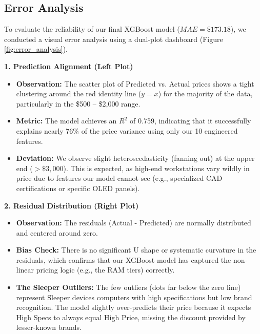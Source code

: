 \documentclass[11pt, a4paper]{article}
\begin{document}
\subsection{Error Analysis}
To evaluate the reliability of our final XGBoost\cite{xgboost2025} model ($MAE = \$173.18$), we conducted a visual error analysis using a dual-plot dashboard (Figure \ref{fig:error_analysis}).

\vspace{0.3cm}
\textbf{1. Prediction Alignment (Left Plot)}
\begin{itemize}
    \item \textbf{Observation:} The scatter plot of Predicted vs. Actual prices shows a tight clustering around the red identity line ($y=x$) for the majority of the data, particularly in the \$500 -- \$2,000 range.
    \item \textbf{Metric:} The model achieves an $R^2$ of 0.759, indicating that it successfully explains nearly 76\% of the price variance using only our 10 engineered features.
    \item \textbf{Deviation:} We observe slight heteroscedasticity (fanning out) at the upper end ($>\$3,000$). This is expected, as high-end workstations vary wildly in price due to features our model cannot see (e.g., specialized CAD certifications or specific OLED panels).
\end{itemize}

\vspace{0.3cm}
\textbf{2. Residual Distribution (Right Plot)}
\begin{itemize}
    \item \textbf{Observation:} The residuals (Actual - Predicted) are normally distributed and centered around zero.
    \item \textbf{Bias Check:} There is no significant U shape or systematic curvature in the residuals, which confirms that our XGBoost model has captured the non-linear pricing logic (e.g., the RAM tiers) correctly.
    \item \textbf{The Sleeper Outliers:} The few outliers (dots far below the zero line) represent Sleeper devices computers with high specifications but low brand recognition. The model slightly over-predicts their price because it expects High Specs to always equal High Price, missing the discount provided by lesser-known brands.
\end{itemize}
\end{document}
